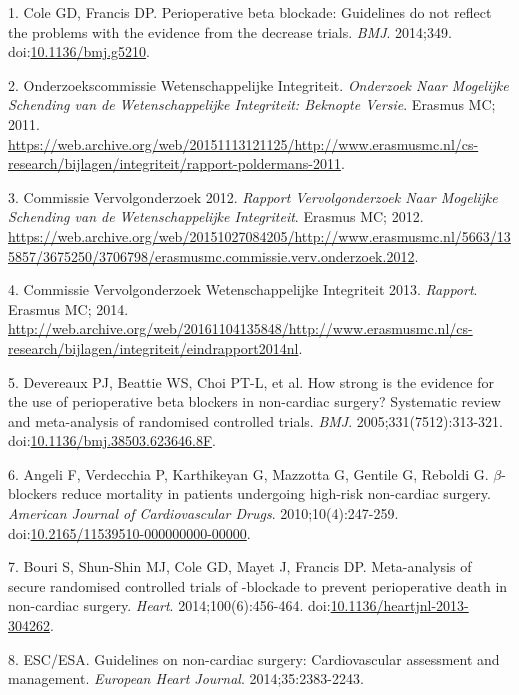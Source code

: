 \documentclass[]{article}
\begin{document}
\hypertarget{refs}{}
\hypertarget{ref-Coleg5210}{}
1. Cole GD, Francis DP. Perioperative beta blockade: Guidelines do not
reflect the problems with the evidence from the decrease trials.
\emph{BMJ}. 2014;349.
doi:\href{https://doi.org/10.1136/bmj.g5210}{10.1136/bmj.g5210}.

\hypertarget{ref-commissie2011}{}
2. Onderzoekscommissie Wetenschappelijke Integriteit. \emph{Onderzoek
Naar Mogelijke Schending van de Wetenschappelijke Integriteit: Beknopte
Versie}. Erasmus MC; 2011.
\url{https://web.archive.org/web/20151113121125/http://www.erasmusmc.nl/cs-research/bijlagen/integriteit/rapport-poldermans-2011}.

\hypertarget{ref-commissie2012}{}
3. Commissie Vervolgonderzoek 2012. \emph{Rapport Vervolgonderzoek Naar
Mogelijke Schending van de Wetenschappelijke Integriteit}. Erasmus MC;
2012.
\url{https://web.archive.org/web/20151027084205/http://www.erasmusmc.nl/5663/135857/3675250/3706798/erasmusmc.commissie.verv.onderzoek.2012}.

\hypertarget{ref-commissie2013}{}
4. Commissie Vervolgonderzoek Wetenschappelijke Integriteit 2013.
\emph{Rapport}. Erasmus MC; 2014.
\url{http://web.archive.org/web/20161104135848/http://www.erasmusmc.nl/cs-research/bijlagen/integriteit/eindrapport2014nl}.

\hypertarget{ref-Devereaux313}{}
5. Devereaux PJ, Beattie WS, Choi PT-L, et al. How strong is the
evidence for the use of perioperative beta blockers in non-cardiac
surgery? Systematic review and meta-analysis of randomised controlled
trials. \emph{BMJ}. 2005;331(7512):313-321.
doi:\href{https://doi.org/10.1136/bmj.38503.623646.8F}{10.1136/bmj.38503.623646.8F}.

\hypertarget{ref-Angeli2010}{}
6. Angeli F, Verdecchia P, Karthikeyan G, Mazzotta G, Gentile G, Reboldi
G. \(\beta\)-blockers reduce mortality in patients undergoing high-risk
non-cardiac surgery. \emph{American Journal of Cardiovascular Drugs}.
2010;10(4):247-259.
doi:\href{https://doi.org/10.2165/11539510-000000000-00000}{10.2165/11539510-000000000-00000}.

\hypertarget{ref-bouri2014}{}
7. Bouri S, Shun-Shin MJ, Cole GD, Mayet J, Francis DP. Meta-analysis of
secure randomised controlled trials of -blockade to prevent
perioperative death in non-cardiac surgery. \emph{Heart}.
2014;100(6):456-464.
doi:\href{https://doi.org/10.1136/heartjnl-2013-304262}{10.1136/heartjnl-2013-304262}.

\hypertarget{ref-esc2014}{}
8. ESC/ESA. Guidelines on non-cardiac surgery: Cardiovascular assessment
and management. \emph{European Heart Journal}. 2014;35:2383-2243.
\end{document}
